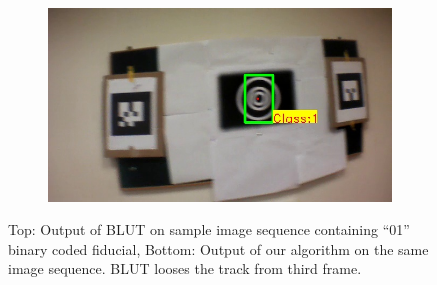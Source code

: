 \documentclass[runningheads]{llncs}
\begin{document}
\begin{figure}
\begin{subfigure}[b]{.19\textwidth}
\end{subfigure}
\begin{subfigure}[b]{.19\textwidth}
\includegraphics[width=\linewidth]{BLUT_input_01/output15.jpg}
\end{subfigure}
\caption{Top: Output of BLUT\cite{Wu:2011} on sample image sequence containing
``01'' binary coded fiducial, Bottom: Output of our algorithm on the same image
sequence. BLUT looses the track from third frame.}
\label{fig:BLUT_compare_01}
\end{figure}
\end{document}
